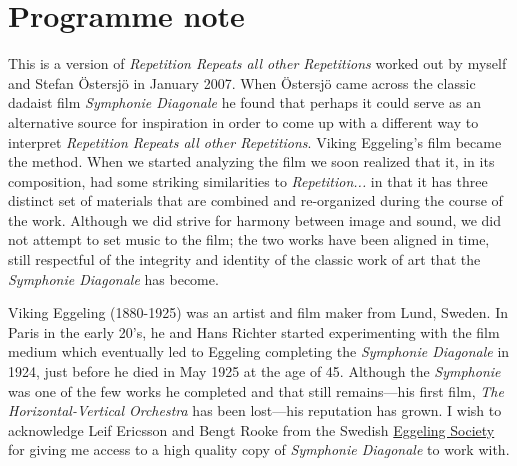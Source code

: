 \section{Programme note}
\label{sec:dia-programme-note}



This is a version of \emph{Repetition Repeats all other Repetitions} worked out by myself and Stefan \"{O}stersj\"{o} in January 2007. When \"{O}stersj\"{o} came across the classic dadaist film \emph{Symphonie Diagonale} he found that perhaps it could serve as an alternative source for inspiration in order to come up with a different way to interpret \emph{Repetition Repeats all other Repetitions}. Viking Eggeling's film became the method. When we started analyzing the film we soon realized that it, in its composition, had some striking similarities to \emph{Repetition...} in that it has three distinct set of materials that are combined and re-organized during the course of the work. Although we did strive for harmony between image and sound, we did not attempt to set music to the film; the two works have been aligned in time, still respectful of the integrity and identity of the classic work of art that the \emph{Symphonie Diagonale} has become.

Viking Eggeling (1880-1925) was an artist and film maker from Lund, Sweden. In Paris in the early 20's, he and Hans Richter started experimenting with the film medium which eventually led to Eggeling completing the \emph{Symphonie Diagonale} in 1924, just before he died in May 1925 at the age of 45. Although the \emph{Symphonie} was one of the few works he completed and that still remains---his first film, \emph{The Horizontal-Vertical Orchestra} has been lost---his reputation has grown. I wish to acknowledge Leif Ericsson and Bengt Rooke from the Swedish \href{http://www.rooke.se/text/viking.html}{Eggeling Society} for giving me access to a high quality copy of \emph{Symphonie Diagonale} to work with.

